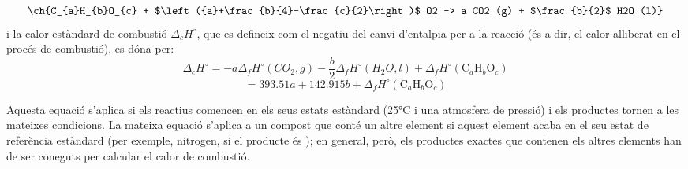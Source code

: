 \documentclass{article}
\begin{document}
\[
\ch{C_{a}H_{b}O_{c} + $\left({a}+\frac{b}{4}-\frac{c}{2}\right)$ O2 -> a CO2 (g) + $\frac{b}{2}$ H2O (l)}
\]
i la calor estàndard de combustió \(\Delta_c H^\circ\), que es defineix com el negatiu del canvi d'entalpia per a la reacció (és a dir, el calor alliberat en el procés de combustió), es dóna per:
\[ \Delta_c H^\circ = -a \Delta_f H^\circ (CO_2, g) - \frac{b}{2} \Delta_f H^\circ (H_2O, l) + \Delta_f H^\circ (\text{C}_a \text{H}_b \text{O}_c) \]
\[ = 393.51a + 142.915b + \Delta_f H^\circ (\text{C}_a \text{H}_b \text{O}_c) \]

Aquesta equació s'aplica si els reactius comencen en els seus estats estàndard (25°C i una atmosfera de pressió) i els productes tornen a les mateixes condicions. La mateixa equació s'aplica a un compost que conté un altre element si aquest element acaba en el seu estat de referència estàndard (per exemple, nitrogen, si el producte és ); en general, però, els productes exactes que contenen els altres elements han de ser coneguts per calcular el calor de combustió.
\end{document}
